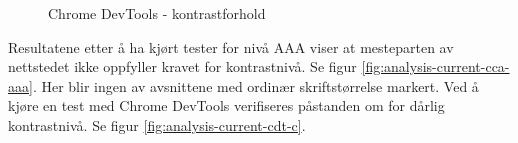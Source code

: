 \begin{figure}[H]
    \begin{center}
        \caption{Chrome DevTools - kontrastforhold}
        \label{fig:analysis-current-cdt}
    \end{center}
\end{figure}

Resultatene etter å ha kjørt tester for nivå AAA viser at mesteparten av nettstedet ikke oppfyller kravet for kontrastnivå. Se figur \ref{fig:analysis-current-cca-aaa}. Her blir ingen av avsnittene med ordinær skriftstørrelse markert. Ved å kjøre en test med Chrome DevTools verifiseres påstanden om for dårlig kontrastnivå. Se figur \ref{fig:analysis-current-cdt-c}.

